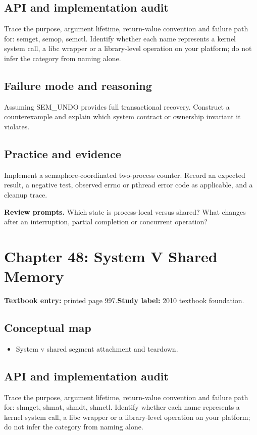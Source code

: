 \documentclass[11pt,letterpaper,oneside]{report}
\begin{document}
\subsection{API and implementation audit}
Trace the purpose, argument lifetime, return-value convention and failure path for: semget, semop, semctl. Identify whether each name represents a kernel system call, a libc wrapper or a library-level operation on your platform; do not infer the category from naming alone.

\subsection{Failure mode and reasoning}
Assuming SEM\_UNDO provides full transactional recovery. Construct a counterexample and explain which system contract or ownership invariant it violates.

\subsection{Practice and evidence}
Implement a semaphore-coordinated two-process counter. Record an expected result, a negative test, observed errno or pthread error code as applicable, and a cleanup trace.

\textbf{Review prompts.} Which state is process-local versus shared? What changes after an interruption, partial completion or concurrent operation?

\section{Chapter 48: System V Shared Memory}
\textbf{Textbook entry:} printed page 997.\quad \textbf{Study label:} 2010 textbook foundation.

\subsection{Conceptual map}
\begin{itemize}
\item System v shared segment attachment and teardown.
\end{itemize}
\subsection{API and implementation audit}
Trace the purpose, argument lifetime, return-value convention and failure path for: shmget, shmat, shmdt, shmctl. Identify whether each name represents a kernel system call, a libc wrapper or a library-level operation on your platform; do not infer the category from naming alone.
\end{document}

